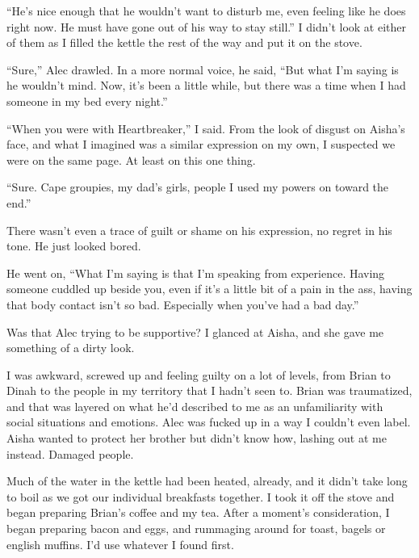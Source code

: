 ``He's nice enough that he wouldn't want to disturb me, even feeling like he does right now.  He must have gone out of his way to stay still.''  I didn't look at either of them as I filled the kettle the rest of the way and put it on the stove.



``Sure,'' Alec drawled.  In a more normal voice, he said, ``But what I'm saying is he wouldn't mind.  Now, it's been a little while, but there was a time when I had someone in my bed every night.''



``When you were with Heartbreaker,'' I said.  From the look of disgust on Aisha's face, and what I imagined was a similar expression on my own, I suspected we were on the same page.  At least on this one thing.



``Sure.  Cape groupies, my dad's girls, people I used my powers on toward the end.''



There wasn't even a trace of guilt or shame on his expression, no regret in his tone.  He just looked bored.



He went on, ``What I'm saying is that I'm speaking from experience.  Having someone cuddled up beside you, even if it's a little bit of a pain in the ass, having that body contact isn't so bad.  Especially when you've had a bad day.''



Was that Alec trying to be supportive?  I glanced at Aisha, and she gave me something of a dirty look.



I was awkward, screwed up and feeling guilty on a lot of levels, from Brian to Dinah to the people in my territory that I hadn't seen to.  Brian was traumatized, and that was layered on what he'd described to me as an unfamiliarity with social situations and emotions.  Alec was fucked up in a way I couldn't even label.  Aisha wanted to protect her brother but didn't know how, lashing out at me instead.  Damaged people.



Much of the water in the kettle had been heated, already, and it didn't take long to boil as we got our individual breakfasts together.  I took it off the stove and began preparing Brian's coffee and my tea.  After a moment's consideration, I began preparing bacon and eggs, and rummaging around for toast, bagels or english muffins.  I'd use whatever I found first.



